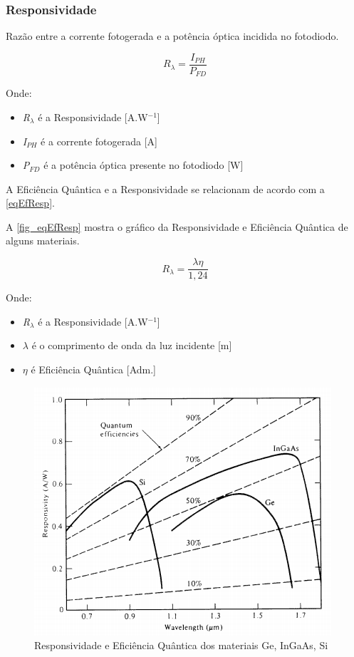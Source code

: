 \subsubsection{Responsividade}
Razão entre a corrente fotogerada e a potência óptica incidida no fotodiodo.

\begin{equation}
    \label{eq_responsividade}
    R_\lambda = \frac{I_{PH}}{P_{FD}}
\end{equation}

Onde:
\begin{itemize}
    \item \emph{R$_\lambda$} \'e a Responsividade [A.W$^{-1}$]
    \item \emph{I$_{PH}$} \'e a corrente fotogerada [A]
    \item \emph{P$_{FD}$} \'e a pot\^encia \'optica presente no fotodiodo [W]
\end{itemize}

A Eficiência Quântica e a Responsividade se relacionam de acordo com a \autoref{eqEfResp}.

A \autoref{fig_eqEfResp} mostra o gráfico da Responsividade e Efici\^encia Qu\^antica de alguns materiais.

\begin{equation}
    \label{eqEfResp}
    R_\lambda = \frac{\lambda\eta}{1,24}
\end{equation}

Onde:
\begin{itemize}
    \item \emph{R$_\lambda$} \'e a Responsividade [A.W$^{-1}$]
    \item $\lambda$ \'e o comprimento de onda da luz incidente [m]
    \item $\eta$ \'e Efici\^encia Qu\^antica [Adm.]
\end{itemize}

\begin{figure}[htb]
	\caption{\label{fig_responsividade}Responsividade e Efici\^encia Qu\^antica dos materiais Ge, InGaAs, Si}
	\begin{center}
	    \includegraphics[scale=0.5]{Imagens/GraficoRespostaEspectral.png}
	\end{center}
	\label{fig_eqEfResp}
\end{figure}


